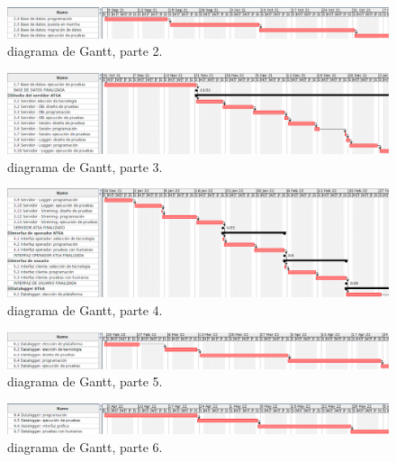 \documentclass[
12pt,
spanish,
singlespacing,
parskip,
headsepline,]{article}
\begin{document}
\begin{figure}[H]
	\centering
	\includegraphics[width=\textwidth]{Figuras/gantt02.png}
	\caption{diagrama de Gantt, parte 2.}
	\label{fig:gantt2}
\end{figure}

\begin{figure}[H]
	\centering
	\includegraphics[width=\textwidth]{Figuras/gantt03.png}
	\caption{diagrama de Gantt, parte 3.}
	\label{fig:gantt3}
\end{figure}

\begin{figure}[H]
	\centering
	\includegraphics[width=\textwidth]{Figuras/gantt04.png}
	\caption{diagrama de Gantt, parte 4.}
	\label{fig:gantt4}
\end{figure}

\begin{figure}[H]
	\centering
	\includegraphics[width=\textwidth]{Figuras/gantt05.png}
	\caption{diagrama de Gantt, parte 5.}
	\label{fig:gantt5}
\end{figure}

\begin{figure}[H]
	\centering
	\includegraphics[width=\textwidth]{Figuras/gantt06.png}
	\caption{diagrama de Gantt, parte 6.}
	\label{fig:gantt6}
\end{figure}
\end{document}
